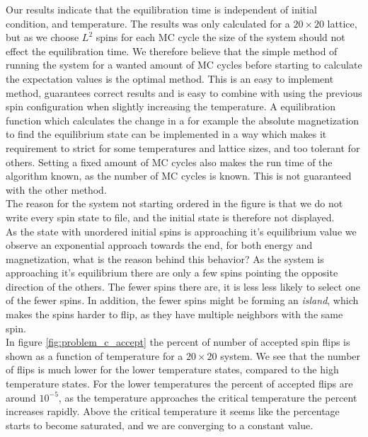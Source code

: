\documentclass[%
 reprint,
nofootinbib,
aps,
]{revtex4-1}
\begin{document}
Our results indicate that the equilibration time is independent of initial condition, and temperature. The results was only calculated for a $20\times 20$ lattice, but as we choose $L^2$ spins for each MC cycle the size of the system should not effect the equilibration time. We therefore believe that the simple method of running the system for a wanted amount of MC cycles before starting to calculate the expectation values is the optimal method. This is an easy to implement method, guarantees correct results and is easy to combine with using the previous spin configuration when slightly increasing the temperature. A equilibration function which calculates the change in a for example the absolute magnetization to find the equilibrium state can be implemented in a way which makes it requirement to strict for some temperatures and lattice sizes, and too tolerant for others. Setting a fixed amount of MC cycles also makes the run time of the algorithm known, as the number of MC cycles is known. This is not guaranteed with the other method. \\
The reason for the system not starting ordered in the figure is that we do not write every spin state to file, and the initial state is therefore not displayed.\\
As the state with unordered initial spins is approaching it's equilibrium value we observe an exponential approach towards the end, for both energy and magnetization, what is the reason behind this behavior? As the system is approaching it's equilibrium there are only a few spins pointing the opposite direction of the others. The fewer spins there are, it is less less likely to select one of the fewer spins. In addition, the fewer spins might be forming an \textit{island}, which makes the spins harder to flip, as they have multiple neighbors with the same spin.
\\In figure \vref{fig:problem_c_accept} the percent of number of accepted spin flips is shown as a function of temperature for a $20\times 20$ system. We see that the number of flips is much lower for the lower temperature states, compared to the high temperature states. For the lower temperatures the percent of accepted flips are around $10^{-5}$, as the temperature approaches the critical temperature the percent increases rapidly. Above the critical temperature it seems like the percentage starts to become saturated, and we are converging to a constant value.
\end{document}
